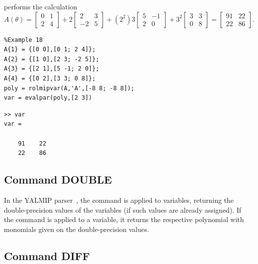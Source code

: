 \documentclass[english,11pt]{article}
\theoremstyle{break} \theorembodyfont{\small\rm}
\begin{document}
\noindent performs the calculation
\[
 A(\theta) = \begin{bmatrix} 0 & 1 \\ 2 & 4 \end{bmatrix} +
 2 \begin{bmatrix} 2 & 3 \\ -2 & 5 \end{bmatrix} +
 (2^2)3 \begin{bmatrix} 5 & -1\\ 2 & 0 \end{bmatrix} +
 3^2 \begin{bmatrix} 3 & 3 \\ 0 & 8 \end{bmatrix} =
 \begin{bmatrix} 91 & 22 \\ 22 & 86 \end{bmatrix}.
\]

\begin{minipage}{9.5cm}
 \begin{lstlisting}
%Example 18
A{1} = {[0 0],[0 1; 2 4]};
A{2} = {[1 0],[2 3; -2 5]};
A{3} = {[2 1],[5 -1; 2 0]};
A{4} = {[0 2],[3 3; 0 8]};
poly = rolmipvar(A,'A',[-8 8; -8 8]);
var = evalpar(poly,[2 3])
 \end{lstlisting}
\end{minipage}
\vspace{0.2cm}

\begin{minipage}{7.5cm}
\begin{lstlisting}[rulecolor=\color{red}]
>> var
var =

    91    22
    22    86
\end{lstlisting}
\end{minipage}
\vspace{0.2cm}

\subsection*{Command DOUBLE}

In the YALMIP parser~\cite{Lof:04}, the command  is applied to  variables,
returning the double-precision values of the variables (if such values are already assigned).
If the command  is applied to a  variable, it returns the
respective polynomial with monomials given on the double-precision values.

\subsection*{Command DIFF}
\end{document}
